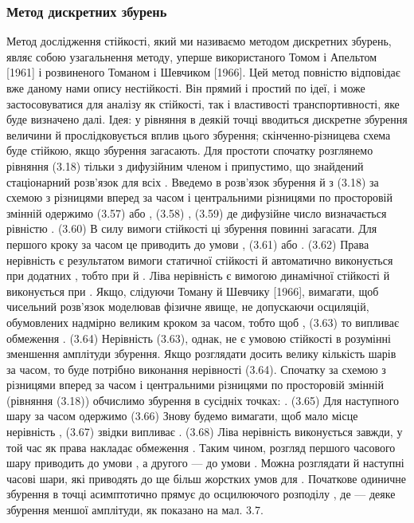 \subsubsection{Метод дискретних збурень}

Метод дослідження стійкості, який ми називаємо методом дискретних збурень, являє собою узагальнення методу, уперше використаного Томом і Апельтом [1961] і розвиненого Томаном і Шевчиком [1966]. Цей метод повністю відповідає вже даному нами опису нестійкості. Він прямий і простий по ідеї, і може застосовуватися для аналізу як стійкості, так і властивості транспортивності, яке буде визначено далі. Ідея: у рівняння в деякій точці вводиться дискретне збурення величини   й прослідковується вплив цього збурення; скінченно-різницева схема буде стійкою, якщо збурення загасають.
Для простоти спочатку розглянемо рівняння (3.18) тільки з дифузійним членом і припустимо, що знайдений стаціонарний розв'язок   для всіх  . Введемо в розв'язок збурення   й з (3.18) за схемою з різницями вперед за часом і центральними різницями по просторовій змінній одержимо
  	(3.57)
або
 ,	(3.58)
 ,	(3.59)
де дифузійне число   визначається рівністю
  .	(3.60)
В силу вимоги стійкості ці збурення повинні загасати. Для першого кроку за часом це приводить до умови
 , 	(3.61)
або
 . 	(3.62)
Права нерівність є результатом вимоги статичної стійкості й автоматично виконується при додатних  , тобто при   й  . Ліва нерівність є вимогою динамічної стійкості й виконується при  . Якщо, слідуючи Томану й Шевчику [1966], вимагати, щоб чисельний розв'язок моделював фізичне явище, не допускаючи осциляцій, обумовлених надмірно великим кроком за часом, тобто щоб
 ,	(3.63)
то випливає обмеження
 . 	(3.64)
Нерівність (3.63), однак, не є умовою стійкості в розумінні зменшення амплітуди збурення. Якщо розглядати досить велику кількість шарів за часом, то буде потрібно виконання нерівності (3.64). Спочатку за схемою з різницями вперед за часом і центральними різницями по просторовій змінній (рівняння (3.18)) обчислимо збурення в сусідніх точках:
  .	(3.65)
Для наступного шару за часом одержимо
            	(3.66)
Знову будемо вимагати, щоб мало місце нерівність
 ,	(3.67)
звідки випливає
 .	(3.68)
Ліва нерівність виконується завжди, у той час як права накладає обмеження  .
Таким чином, розгляд першого часового шару приводить до умови , а другого — до умови  . Можна розглядати й наступні часові шари, які приводять до ще більш жорстких умов для  . Початкове одиничне збурення   в точці   асимптотично прямує до осцилюючого розподілу , де  — деяке збурення меншої амплітуди, як показано на мал. 3.7.
 
